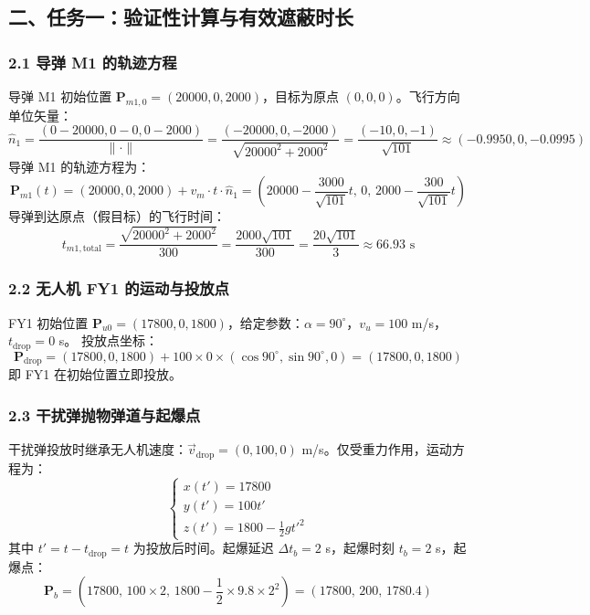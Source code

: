 \documentclass{JXUSTmodeling}
\begin{document}
\subsection{二、任务一：验证性计算与有效遮蔽时长}
\subsubsection{2.1 导弹 M1 的轨迹方程}
导弹 M1 初始位置 $\mathbf{P}_{m1,0} = (20000, 0, 2000)$，目标为原点 $(0,0,0)$。飞行方向单位矢量：
$$\hat{n}_1 = \frac{(0-20000, 0-0, 0-2000)}{\|\cdot\|} = \frac{(-20000, 0, -2000)}{\sqrt{20000^2 + 2000^2}} = \frac{(-10, 0, -1)}{\sqrt{101}} \approx (-0.9950, 0, -0.0995)$$
导弹 M1 的轨迹方程为：
\begin{equation}
\mathbf{P}_{m1}(t) = (20000, 0, 2000) + v_m \cdot t \cdot \hat{n}_1 = \left(20000 - \frac{3000}{\sqrt{101}}t, \, 0, \, 2000 - \frac{300}{\sqrt{101}}t\right) \tag{1}
\end{equation}
导弹到达原点（假目标）的飞行时间：
\begin{equation}
t_{m1,\text{total}} = \frac{\sqrt{20000^2 + 2000^2}}{300} = \frac{2000\sqrt{101}}{300} = \frac{20\sqrt{101}}{3} \approx 66.93 \text{ s} \tag{2}
\end{equation}
\subsubsection{2.2 无人机 FY1 的运动与投放点}
FY1 初始位置 $\mathbf{P}_{u0} = (17800, 0, 1800)$，给定参数：$\alpha = 90^\circ$，$v_u = 100$ m/s，$t_{\text{drop}} = 0$ s。
投放点坐标：
\begin{equation}
\mathbf{P}_{\text{drop}} = (17800, 0, 1800) + 100 \times 0 \times (\cos 90^\circ, \sin 90^\circ, 0) = (17800, 0, 1800) \tag{3}
\end{equation}
即 FY1 在初始位置立即投放。
\subsubsection{2.3 干扰弹抛物弹道与起爆点}
干扰弹投放时继承无人机速度：$\vec{v}_{\text{drop}} = (0, 100, 0)$ m/s。仅受重力作用，运动方程为：
\begin{equation}
\begin{cases}
x(t') = 17800 \\
y(t') = 100 t' \\
z(t') = 1800 - \frac{1}{2}gt'^2
\end{cases} \tag{4}
\end{equation}
其中 $t' = t - t_{\text{drop}} = t$ 为投放后时间。起爆延迟 $\Delta t_b = 2$ s，起爆时刻 $t_b = 2$ s，起爆点：
\begin{equation}
\mathbf{P}_b = (17800, \, 100 \times 2, \, 1800 - \frac{1}{2} \times 9.8 \times 2^2) = (17800, \, 200, \, 1780.4) \tag{5}
\end{equation}
\end{document}
